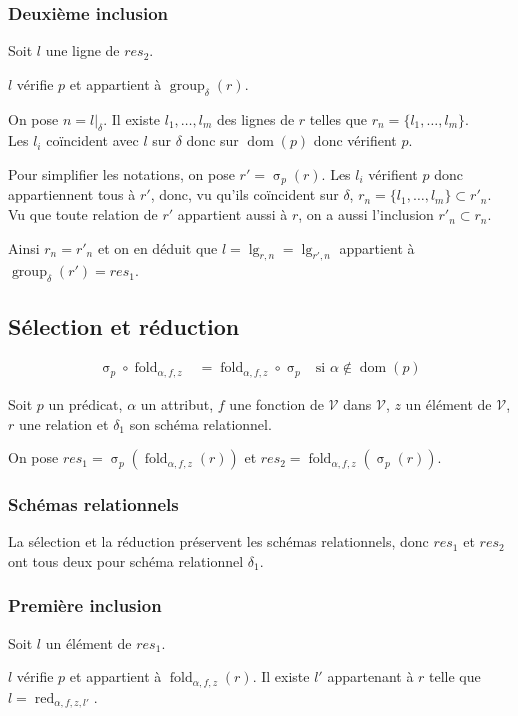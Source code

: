 \documentclass[french]{article}
\DeclareMathOperator{\sel}{\sigma}
\DeclareMathOperator{\group}{group}
\DeclareMathOperator{\dom}{dom}
\DeclareMathOperator{\lgr}{lg}
\DeclareMathOperator{\redu}{red}
\newcommand{\selP}{\sel_p}
\newcommand{\groupDelta}{\group_{\delta}}
\newcommand{\val}{\mathcal{V}}
\newcommand{\fold}[3]{\operatorname{fold}_{#1, #2, #3}}
\newcommand{\foldAlphafz}{\fold{\alpha}{f}{z}}
\begin{document}
\subsubsection*{Deuxième inclusion}
Soit $l$ une ligne de $res_2$.

$l$ vérifie $p$ et appartient à $\groupDelta(r)$.

On pose $n = l|_\delta$. Il existe $l_1, \dots, l_m$
des lignes de $r$ telles que $r_n = \{l_1, \dots, l_m\}$. \\

Les $l_i$ coïncident avec $l$ sur $\delta$ donc sur $\dom(p)$
donc vérifient $p$.

Pour simplifier les notations, on pose $r' = \selP(r)$.
Les $l_i$ vérifient $p$ donc appartiennent tous à $r'$,
donc, vu qu'ils coïncident sur $\delta$,
$r_n = \{l_1, \dots, l_m \} \subset r'_n$.
Vu que toute relation de $r'$ appartient aussi à $r$,
on a aussi l'inclusion $r'_n \subset r_n$.

Ainsi $r_n = r'_n$ et on en déduit que 
$l = \lgr_{r,n} = \lgr_{r', n}$ appartient
à $\groupDelta(r') = res_1$.

\subsection*{Sélection et réduction}
\begin{align}
\selP \circ \foldAlphafz & = \foldAlphafz \circ \selP
& \text{si $\alpha \notin \dom(p)$}
\end{align}

Soit $p$ un prédicat, $\alpha$ un attribut,
$f$ une fonction de $\val$ dans $\val$,
$z$ un élément de $\val$, $r$ une relation
et $\delta_1$ son schéma relationnel.

On pose
$res_1 = \selP(\foldAlphafz(r))$
et
$res_2 = \foldAlphafz(\selP(r))$.

\subsubsection*{Schémas relationnels}
La sélection et la réduction préservent les schémas relationnels,
donc $res_1$ et $res_2$ ont tous deux
pour schéma relationnel $\delta_1$.

\subsubsection*{Première inclusion}
Soit $l$ un élément de $res_1$.

$l$ vérifie $p$ et appartient à $\foldAlphafz(r)$.
Il existe $l'$ appartenant à $r$ telle que
$l = \redu_{\alpha, f, z, l'}$. \\
\end{document}
